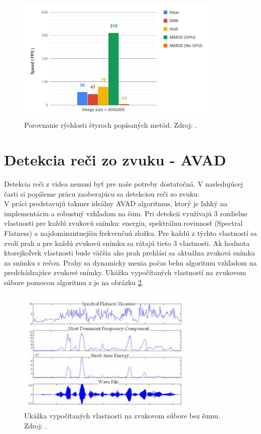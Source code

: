 \begin{figure}[H]
	\begin{center}
		\includegraphics[height=6cm]{pics/face-detection-speed-comparison.jpg}
		\caption{Porovnanie rýchlosti štyroch popísaných metód.
		Zdroj: \cite{OpenCVvsDlib}.}
		\label{pic-face-detection-speed-comparison}
	\end{center}
\end{figure}

\section{Detekcia reči zo zvuku - AVAD}
Detekcia reči z videa nemusí byť pre naše potreby dostatočná. V nasledujúcej časti si popíšeme prácu zaoberajúcu sa detekciou reči zo zvuku.\\

V práci \cite{moattar2009simple} predstavujú takmer ideálny AVAD algoritmus, ktorý je ľahký na implementáciu a robustný vzhľadom na šum.
Pri detekcii využívajú 3 rozdielne vlastnosti pre každú zvukovú snímku: energiu, spektrálnu rovinnosť (Spectral Flatness) a najdominantnejšiu frekvenčnú zložku.
Pre každú z týchto vlastností sa zvolí prah a pre každú zvukovú snímku sa rátajú tieto 3 vlastnosti.
Ak hodnota ktorejkoľvek vlastnosti bude väčšia ako prah prehlási sa aktuálna zvuková snímka za snímku s rečou.
Prahy sa dynamicky menia počas behu algoritmu vzhľadom na predchádzajúce zvukové snímky.
Ukážka vypočítaných vlastností na zvukovom súbore pomocou algoritmu z \cite{moattar2009simple} je na obrázku \ref{pic-avad}.

\begin{figure}[H]
	\begin{center}
		\includegraphics[height=6cm]{pics/avad.png}
		\caption{Ukážka vypočítaných vlastností na zvukovom súbore bez šumu.
		Zdroj: \cite{moattar2009simple}.}
		\label{pic-avad}
	\end{center}
\end{figure}

